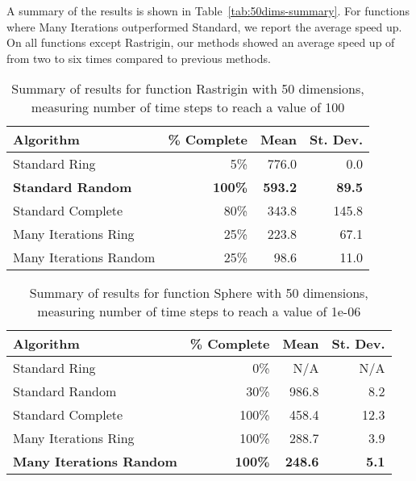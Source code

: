\documentclass[ms,electronic,twosidetoc,letterpaper,chaptercenter,parttop,equalmargins]{byumsphd}
\newcommand{\tabref}[1]{Table~\ref{tab:#1}}
\begin{document}
A summary of the results is shown in \tabref{50dims-summary}.  For functions
where Many Iterations outperformed Standard, we report the average speed up.
On all functions except Rastrigin, our methods showed an average speed up of
from two to six times compared to previous methods.

\begin{table}
  \caption{Summary of results for function Rastrigin with 50 dimensions,
  measuring number of time steps to reach a value of 100}
  \label{tab:rastrigin-50}
  \centering
  \begin{tabular}{|l|r|r|r|}
  \hline
  Algorithm&\% Complete&Mean&St. Dev.\\
  \hline
  \hline
  Standard Ring&5\%&776.0&0.0\\
  \hline
  \textbf{Standard Random}&\textbf{100\%}&\textbf{593.2}&\textbf{89.5}\\
  \hline
  Standard Complete&80\%&343.8&145.8\\
  \hline
  Many Iterations Ring&25\%&223.8&67.1\\
  \hline
  Many Iterations Random&25\%&98.6&11.0\\
  \hline
  \end{tabular}
\end{table}

\begin{table}
  \caption{Summary of results for function Sphere with 50 dimensions,
  measuring number of time steps to reach a value of 1e-06}
  \label{tab:sphere-50}
  \centering
  \begin{tabular}{|l|r|r|r|}
  \hline
  Algorithm&\% Complete&Mean&St. Dev.\\
  \hline
  \hline
  Standard Ring&0\%&N/A&N/A\\
  \hline
  Standard Random&30\%&986.8&8.2\\
  \hline
  Standard Complete&100\%&458.4&12.3\\
  \hline
  Many Iterations Ring&100\%&288.7&3.9\\
  \hline
  \textbf{Many Iterations Random}&\textbf{100\%}&\textbf{248.6}&\textbf{5.1}\\
  \hline
  \end{tabular}
\end{table}
\end{document}
